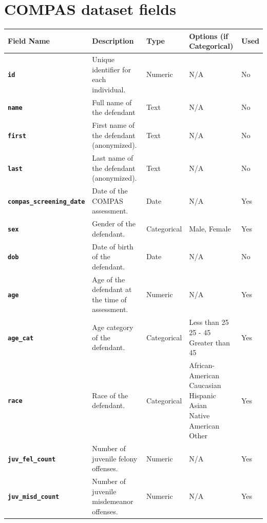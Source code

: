 \documentclass[conference]{IEEEtran}
\begin{document}
	
	
	
\printbibliography

\onecolumn
\pagebreak
\appendix 
\section{COMPAS dataset fields}

	\begin{table}[!ht]
	\centering
	\begin{tabular}{|l|l|l|l|l|}
		\hline
		Field Name	&	Description	&	Type	&	Options (if Categorical)	&	Used \\ \hline\hline
		\textbf{\texttt{id}}	&	Unique identifier for each individual.	&	Numeric	&	N/A	&	No \\ \hline
		\textbf{\texttt{name}}	&	Full name of the defendant	&	Text	&	N/A	&	No \\ \hline
		\textbf{\texttt{first}}	&	First name of the defendant (anonymized).	&	Text	&	N/A	&	No \\ \hline
		\textbf{\texttt{last}}	&	Last name of the defendant (anonymized).	&	Text	&	N/A	&	No \\ \hline
		\textbf{\texttt{compas\_screening\_date}}	&	Date of the COMPAS assessment.	&	Date	&	N/A	&	Yes \\ \hline
		\textbf{\texttt{sex}}	&	Gender of the defendant.	&	Categorical	&	Male, Female	&	Yes \\ \hline
		\textbf{\texttt{dob}}	&	Date of birth of the defendant.	&	Date	&	N/A	&	No \\ \hline
		\textbf{\texttt{age}}	&	Age of the defendant at the time of assessment.	&	Numeric	&	N/A	&	Yes \\ \hline
		\textbf{\texttt{age\_cat}}	&	Age category of the defendant.	&	Categorical	&	\makecell[l]{Less than 25\\25 - 45\\Greater than 45}	&	Yes \\ \hline
		\textbf{\texttt{race}}	&	Race of the defendant.	&	Categorical	&	\makecell[l]{African-American\\Caucasian\\Hispanic\\Asian\\Native American\\Other}	&	Yes \\ \hline
		\textbf{\texttt{juv\_fel\_count}}	&	Number of juvenile felony offenses.	&	Numeric	&	N/A	&	Yes \\ \hline
		\textbf{\texttt{juv\_misd\_count}}	&	Number of juvenile misdemeanor offenses.	&	Numeric	&	N/A	&	Yes \\ \hline

\end{tabular}
\end{table}
\end{document}
